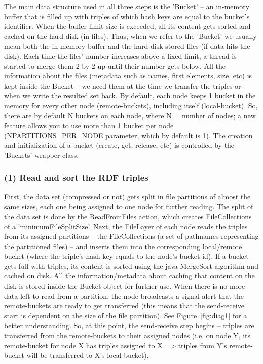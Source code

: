 The main data structure used in all three steps is the 'Bucket' -- an in-memory buffer that is filled up with triples of which hash keys are equal to the bucket's identifier. When the buffer limit size is exceeded, all its content gets sorted and cached on the hard-disk (in files). Thus, when we refer to the 'Bucket' we usually mean both the in-memory buffer and the hard-disk stored files (if data hits the disk). Each time the files' number increases above a fixed limit, a thread is started to merge them 2-by-2 up until their number gets below. All the information about the files (metadata such as names, first elements, size, etc) is kept inside the Bucket -- we need them at the time we transfer the triples or when we write the resulted set back. By default, each node keeps 1 bucket in the memory for every other node (remote-buckets), including itself (local-bucket). So, there are by default N buckets on each node, where N = number of nodes; a new feature allows you to use more than 1 bucket per node (NPARTITIONS\_PER\_NODE parameter, which by default is 1). The creation and initialization of a bucket (create, get, release, etc) is controlled by the 'Buckets' wrapper class.

% 
\subsubsection*{(1) Read and sort the RDF triples}

First, the data set (compressed or not) gets split in file partitions of almost the same sizes, each one being assigned to one node for further reading. The split of the data set is done by the ReadFromFiles action, which creates FileCollections of a 'minimumFileSplitSize'. Next, the FileLayer of each node reads the triples from its assigned partitions -- the FileCollections (a set of pathnames representing the partitioned files) -- and inserts them into the corresponding local/remote bucket (where the triple's hash key equals to the node's bucket id). If a bucket gets full with triples, its content is sorted using the java MergeSort algorithm and cached on disk. All the information/metadata about caching that content on the disk is stored inside the Bucket object for further use. When there is no more data left to read from a partition, the node broadcasts a signal alert that the remote-buckets are ready to get transferred (this means that the send-receive start is dependent on the size of the file partition). See Figure~\ref{fig:diag1} for a better understanding. So, at this point, the send-receive step begins -- triples are transferred from the remote-buckets to their assigned nodes (i.e. on node Y, its remote-bucket for node X has triples assigned to X \textit{=>} triples from Y's remote-bucket will be transferred to X's local-bucket).

